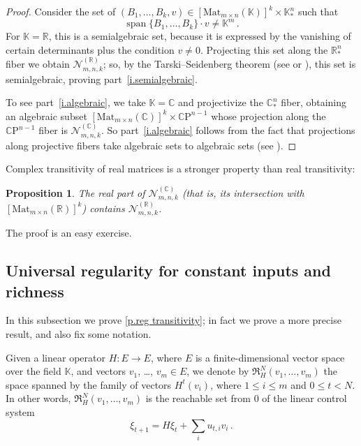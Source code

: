 \documentclass[10pt, a4paper]{amsart}
\theoremstyle{plain}
\newtheorem{prop}[lemma]{Proposition}
\theoremstyle{definition}
\theoremstyle{remark}
\theoremstyle{note}
\numberwithin{equation}{section}
\begin{document}
\begin{proof} 
Consider the set of $(B_1, \dots, B_k, v) \in [{\mathrm{Mat}}_{m \times n}({\mathbb{K}})]^k \times {\mathbb{K}}^n_*$ 
such that 
$$
\operatorname*{span}\{B_1, \dots, B_k\}\cdot v \neq {\mathbb{K}}^m \, .
$$
For ${\mathbb{K}} = {\mathbb{R}}$, this is a semialgebraic set,
because it is expressed by the vanishing of certain determinants
plus the condition $v \neq 0$.
Projecting this set along the ${\mathbb{R}}^n_*$ fiber we obtain ${\mathcal{N}}_{m,n,k}^{({\mathbb{R}})}$;
so, by the Tarski--Seidenberg theorem (see \cite[p.~60]{BR} or \cite[p.~26]{BCR}),
this set is semialgebraic, proving part~\ref{i.semialgebraic}.

To see part~\ref{i.algebraic},
we take ${\mathbb{K}}={\mathbb{C}}$ and projectivize the ${\mathbb{C}}^n_*$ fiber, obtaining an
algebraic subset $[{\mathrm{Mat}}_{m \times n}({\mathbb{C}})]^k \times {\mathbb{C}\mathrm{P}}^{n-1}$
whose projection along the ${\mathbb{C}\mathrm{P}}^{n-1}$ fiber is  ${\mathcal{N}}_{m,n,k}^{({\mathbb{C}})}$.
So part~\ref{i.algebraic} follows from the fact that projections 
along projective fibers take algebraic sets to algebraic sets (see \cite[p.~58]{Shafa}).
\end{proof}

Complex transitivity of real matrices is a stronger property than real transitivity:

\begin{prop}\label{p.NT inclusion}
The real part of ${\mathcal{N}}_{m,n,k}^{({\mathbb{C}})}$ (that is, its intersection with $[{\mathrm{Mat}}_{m \times n}({\mathbb{R}})]^k$)
contains ${\mathcal{N}}_{m,n,k}^{({\mathbb{R}})}$.
\end{prop}

The proof is an easy exercise.

\subsection{Universal regularity for constant inputs and richness}\label{ss.characterization}

In this subsection we prove \cref{p.reg transitivity};
in fact we prove a more precise result, and also fix some notation.

Given a linear operator $H \colon E \to E$, 
where $E$ is a finite-dimensional vector space over the field ${\mathbb{K}}$,
and vectors $v_1$, \dots, $v_m \in E$, 
we denote by ${\mathfrak{R}}^N_H(v_1,\dots,v_m)$ the space spanned by 
the family of vectors $H^t(v_i)$, where $1\le i \le m$ and $0 \le t < N$.
In other words,  ${\mathfrak{R}}^N_H(v_1,\dots,v_m)$ is the reachable set from $0$ of the linear
control system 
$$
\xi_{t+1} = H\xi_t + \sum_i u_{t,i} v_i \, .
$$
\end{document}
